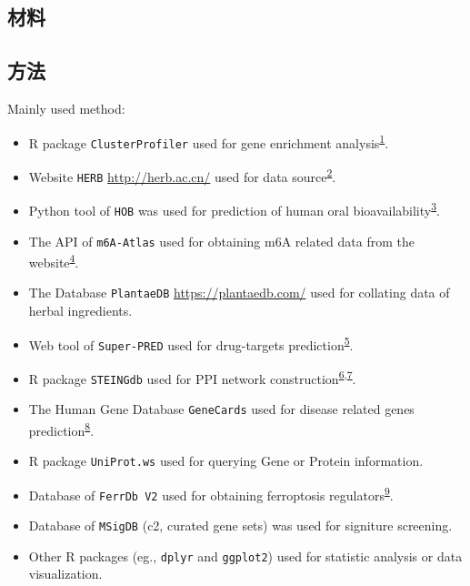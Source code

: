 \documentclass[
]{article}
\providecommand{\tightlist}{%
  \setlength{\itemsep}{0pt}\setlength{\parskip}{0pt}}
\begin{document}
\hypertarget{ux6750ux6599}{%
\subsection{材料}\label{ux6750ux6599}}

\hypertarget{ux65b9ux6cd5}{%
\subsection{方法}\label{ux65b9ux6cd5}}

Mainly used method:

\begin{itemize}
\tightlist
\item
  R package \texttt{ClusterProfiler} used for gene enrichment analysis\textsuperscript{\protect\hyperlink{ref-ClusterprofilerWuTi2021}{1}}.
\item
  Website \texttt{HERB} \url{http://herb.ac.cn/} used for data source\textsuperscript{\protect\hyperlink{ref-HerbAHighThFang2021}{2}}.
\item
  Python tool of \texttt{HOB} was used for prediction of human oral bioavailability\textsuperscript{\protect\hyperlink{ref-HobpreAccuratWeiM2022}{3}}.
\item
  The API of \texttt{m6A-Atlas} used for obtaining m6A related data from the website\textsuperscript{\protect\hyperlink{ref-M6aAtlasV20Liang2024}{4}}.
\item
  The Database \texttt{PlantaeDB} \url{https://plantaedb.com/} used for collating data of herbal ingredients.
\item
  Web tool of \texttt{Super-PRED} used for drug-targets prediction\textsuperscript{\protect\hyperlink{ref-SuperpredUpdaNickel2014}{5}}.
\item
  R package \texttt{STEINGdb} used for PPI network construction\textsuperscript{\protect\hyperlink{ref-TheStringDataSzklar2021}{6},\protect\hyperlink{ref-CytohubbaIdenChin2014}{7}}.
\item
  The Human Gene Database \texttt{GeneCards} used for disease related genes prediction\textsuperscript{\protect\hyperlink{ref-TheGenecardsSStelze2016}{8}}.
\item
  R package \texttt{UniProt.ws} used for querying Gene or Protein information.
\item
  Database of \texttt{FerrDb\ V2} used for obtaining ferroptosis regulators\textsuperscript{\protect\hyperlink{ref-FerrdbV2UpdaZhou2023}{9}}.
\item
  Database of \texttt{MSigDB} (c2, curated gene sets) was used for signiture screening.
\item
  Other R packages (eg., \texttt{dplyr} and \texttt{ggplot2}) used for statistic analysis or data visualization.
\end{itemize}
\end{document}
